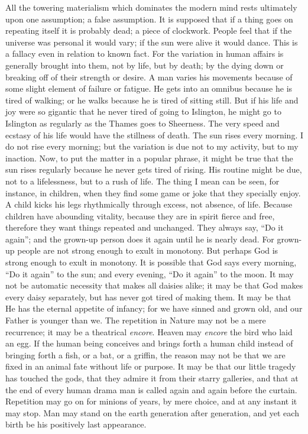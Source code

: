 \documentclass{book}
\begin{document}
All the towering materialism which dominates the modern mind rests ultimately upon one assumption; a false assumption. It is supposed that if a thing goes on repeating itself it is probably dead; a piece of clockwork. People feel that if the universe was personal it would vary; if the sun were alive it would dance. This is a fallacy even in relation to known fact. For the variation in human affairs is generally brought into them, not by life, but by death; by the dying down or breaking off of their strength or desire. A man varies his movements because of some slight element of failure or fatigue. He gets into an omnibus because he is tired of walking; or he walks because he is tired of sitting still. But if his life and joy were so gigantic that he never tired of going to Islington, he might go to Islington as regularly as the Thames goes to Sheerness. The very speed and ecstasy of his life would have the stillness of death. The sun rises every morning. I do not rise every morning; but the variation is due not to my activity, but to my inaction. Now, to put the matter in a popular phrase, it might be true that the sun rises regularly because he never gets tired of rising. His routine might be due, not to a lifelessness, but to a rush of life. The thing I mean can be seen, for instance, in children, when they find some game or joke that they specially enjoy. A child kicks his legs rhythmically through excess, not absence, of life. Because children have abounding vitality, because they are in spirit fierce and free, therefore they want things repeated and unchanged. They always say, “Do it again”; and the grown-up person does it again until he is nearly dead. For grown-up people are not strong enough to exult in monotony. But perhaps God is strong enough to exult in monotony. It is possible that God says every morning, “Do it again” to the sun; and every evening, “Do it again” to the moon. It may not be automatic necessity that makes all daisies alike; it may be that God makes every daisy separately, but has never got tired of making them. It may be that He has the eternal appetite of infancy; for we have sinned and grown old, and our Father is younger than we. The repetition in Nature may not be a mere recurrence; it may be a theatrical \emph{encore}. Heaven may \emph{encore} the bird who laid an egg. If the human being conceives and brings forth a human child instead of bringing forth a fish, or a bat, or a griffin, the reason may not be that we are fixed in an animal fate without life or purpose. It may be that our little tragedy has touched the gods, that they admire it from their starry galleries, and that at the end of every human drama man is called again and again before the curtain. Repetition may go on for minions of years, by mere choice, and at any instant it may stop. Man may stand on the earth generation after generation, and yet each birth be his positively last appearance.
\end{document}

